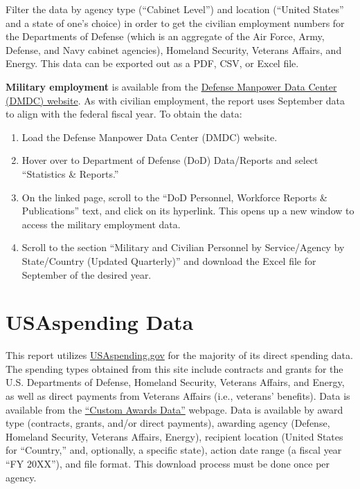 \documentclass[
]{book}
\providecommand{\tightlist}{%
  \setlength{\itemsep}{0pt}\setlength{\parskip}{0pt}}
\begin{document}
Filter the data by agency type (``Cabinet Level'') and location (``United States'' and a state of one's choice) in order to get the civilian employment numbers for the Departments of Defense (which is an aggregate of the Air Force, Army, Defense, and Navy cabinet agencies), Homeland Security, Veterans Affairs, and Energy. This data can be exported out as a PDF, CSV, or Excel file.

\textbf{Military employment} is available from the \href{https://dwp.dmdc.osd.mil/dwp/app/main}{Defense Manpower Data Center (DMDC) website}. As with civilian employment, the report uses September data to align with the federal fiscal year. To obtain the data:

\begin{enumerate}
\def\labelenumi{\arabic{enumi}.}
\tightlist
\item
  Load the Defense Manpower Data Center (DMDC) website.
\item
  Hover over to Department of Defense (DoD) Data/Reports and select ``Statistics \& Reports.''\\
\item
  On the linked page, scroll to the ``DoD Personnel, Workforce Reports \& Publications'' text, and click on its hyperlink. This opens up a new window to access the military employment data.\\
\item
  Scroll to the section ``Military and Civilian Personnel by Service/Agency by State/Country (Updated Quarterly)'' and download the Excel file for September of the desired year.
\end{enumerate}

\hypertarget{usa}{%
\section{USAspending Data}\label{usa}}

This report utilizes \href{https://www.usaspending.gov/}{USAspending.gov} for the majority of its direct spending data. The spending types obtained from this site include contracts and grants for the U.S. Departments of Defense, Homeland Security, Veterans Affairs, and Energy, as well as direct payments from Veterans Affairs (i.e., veterans' benefits). Data is available from the \href{https://www.usaspending.gov/download_center/custom_award_data}{``Custom Awards Data''} webpage. Data is available by award type (contracts, grants, and/or direct payments), awarding agency (Defense, Homeland Security, Veterans Affairs, Energy), recipient location (United States for ``Country,'' and, optionally, a specific state), action date range (a fiscal year ``FY 20XX''), and file format. This download process must be done once per agency.
\end{document}
